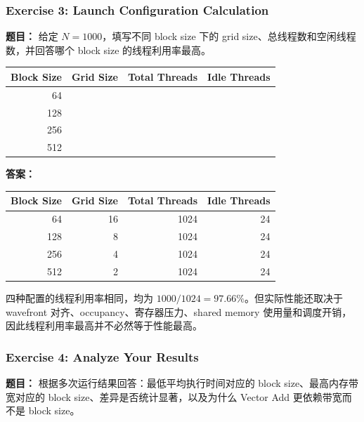 \documentclass[10pt,a4paper]{article}
\begin{document}
\subsubsection{Exercise 3: Launch Configuration Calculation}
\noindent\textbf{题目：} 给定 $N=1000$，填写不同 block size 下的 grid size、总线程数和空闲线程数，并回答哪个 block size 的线程利用率最高。
\begin{center}
\small
\begin{tabular}{rrrr}
\toprule
Block Size & Grid Size & Total Threads & Idle Threads \\
\midrule
64 & \underline{\hspace{2.5em}} & \underline{\hspace{2.5em}} & \underline{\hspace{2.5em}} \\
128 & \underline{\hspace{2.5em}} & \underline{\hspace{2.5em}} & \underline{\hspace{2.5em}} \\
256 & \underline{\hspace{2.5em}} & \underline{\hspace{2.5em}} & \underline{\hspace{2.5em}} \\
512 & \underline{\hspace{2.5em}} & \underline{\hspace{2.5em}} & \underline{\hspace{2.5em}} \\
\bottomrule
\end{tabular}
\end{center}
\noindent\textbf{答案：}
\begin{center}
\small
\begin{tabular}{rrrr}
\toprule
Block Size & Grid Size & Total Threads & Idle Threads \\
\midrule
64 & 16 & 1024 & 24 \\
128 & 8 & 1024 & 24 \\
256 & 4 & 1024 & 24 \\
512 & 2 & 1024 & 24 \\
\bottomrule
\end{tabular}
\end{center}
四种配置的线程利用率相同，均为 $1000/1024=97.66\%$。但实际性能还取决于 wavefront 对齐、occupancy、寄存器压力、shared memory 使用量和调度开销，因此线程利用率最高并不必然等于性能最高。

\subsubsection{Exercise 4: Analyze Your Results}
\noindent\textbf{题目：} 根据多次运行结果回答：最低平均执行时间对应的 block size、最高内存带宽对应的 block size、差异是否统计显著，以及为什么 Vector Add 更依赖带宽而不是 block size。
\end{document}

